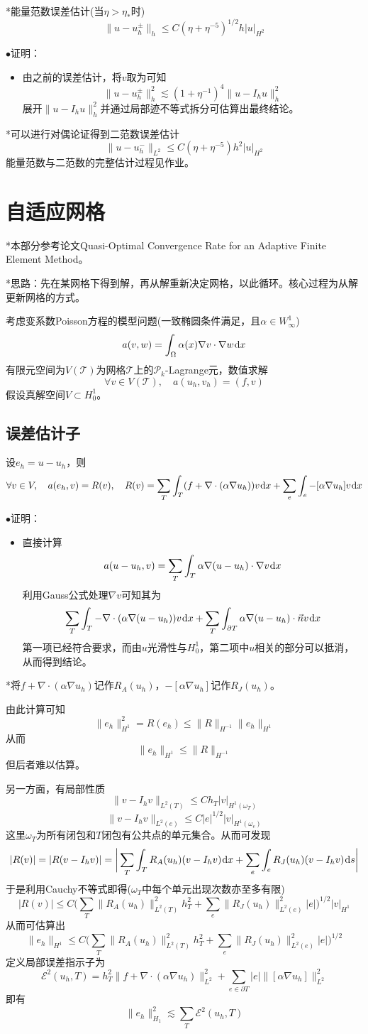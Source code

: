 \documentclass[a4paper,UTF8,fontset=windows]{ctexart}
\newcommand*{\dr}{\hspace{0.07em}\mathrm{d}}
\newcommand*{\ce}{\mathcal{E}}
\newcommand*{\cp}{\mathcal{P}}
\newcommand*{\ct}{\mathcal{T}}
\newcommand{\proo}[1]{{\kaishu $\bullet$证明：
\begin{itemize}
    \item[] #1
\end{itemize}
}}
\begin{document}
*能量范数误差估计(当$\eta>\eta_*$时)
$$\|u-u_h^\pm\|_h\le C(\eta+\eta^{-5})^{1/2}h|u|_{H^2}$$

\proo{
    由之前的误差估计，将$v$取为可知
    $$\|u-u_h^\pm\|_h^2\lesssim(1+\eta^{-1})^4\|u-I_hu\|_h^2$$
    展开$\|u-I_hu\|_h^2$并通过局部迹不等式拆分可估算出最终结论。
}

*可以进行对偶论证得到二范数误差估计
$$\|u-u_h^-\|_{L^2}\le C(\eta+\eta^{-5})h^2|u|_{H^2}$$
能量范数与二范数的完整估计过程见作业。

\section{自适应网格}
*本部分参考论文Quasi-Optimal Convergence Rate for an Adaptive Finite Element Method。

*思路：先在某网格下得到解，再从解重新决定网格，以此循环。核心过程为从解更新网格的方式。

考虑变系数Poisson方程的模型问题(一致椭圆条件满足，且$\alpha\in W_\infty^1$)
$$a(v,w)=\int_\Omega\alpha(x)\nabla v\cdot\nabla w\dr x$$
有限元空间为$V(\ct)$为网格$\ct$上的$\cp_k$-Lagrange元，数值求解
$$\forall v\in V(\ct),\quad a(u_h,v_h)=(f,v)$$
假设真解空间$V\subset H_0^1$。

\subsection{误差估计子}
设$e_h=u-u_h$，则
$$\forall v\in V,\quad a(e_h,v)=R(v),\quad R(v)=\sum_T\int_T(f+\nabla\cdot(\alpha\nabla u_h))v\dr x+\sum_e\int_e-[\alpha\nabla u_h]v\dr x$$

\proo{
    直接计算
    $$a(u-u_h,v)=\sum_T\int_T\alpha\nabla(u-u_h)\cdot\nabla v\dr x$$
    利用Gauss公式处理$\nabla v$可知其为
    $$\sum_T\int_T-\nabla\cdot(\alpha\nabla(u-u_h))v\dr x+\sum_T\int_{\partial T}\alpha\nabla(u-u_h)\cdot\vec{n}v\dr x$$
    第一项已经符合要求，而由$u$光滑性与$H_0^1$，第二项中$u$相关的部分可以抵消，从而得到结论。
}

*将$f+\nabla\cdot(\alpha\nabla u_h)$记作$R_A(u_h)$，$-[\alpha\nabla u_h]$记作$R_J(u_h)$。

由此计算可知
$$\|e_h\|_{H^1}^2=R(e_h)\le\|R\|_{H^{-1}}\|e_h\|_{H^1}$$
从而
$$\|e_h\|_{H^1}\le\|R\|_{H^{-1}}$$
但后者难以估算。

另一方面，有局部性质
$$\|v-I_hv\|_{L^2(T)}\le  Ch_T|v|_{H^1(\omega_T)}$$
$$\|v-I_hv\|_{L^2(e)}\le C|e|^{1/2}|v|_{H^1(\omega_e)}$$
这里$\omega_T$为所有闭包和$T$闭包有公共点的单元集合。从而可发现
$$|R(v)|=|R(v-I_hv)|=\bigg|\sum_T\int_TR_A(u_h)(v-I_hv)\dr x+\sum_e\int_eR_J(u_h)(v-I_hv)\dr s\bigg|$$
于是利用Cauchy不等式即得($\omega_T$中每个单元出现次数亦至多有限)
$$|R(v)|\le C\bigg(\sum_T\|R_A(u_h)\|_{L^2(T)}^2h_T^2+\sum_e\|R_J(u_h)\|_{L^2(e)}^2|e|\bigg)^{1/2}|v|_{H^1}$$
从而可估算出
$$\|e_h\|_{H^1}\le C\bigg(\sum_T\|R_A(u_h)\|_{L^2(T)}^2h_T^2+\sum_e\|R_J(u_h)\|_{L^2(e)}^2|e|\bigg)^{1/2}$$
定义局部误差指示子为
$$\ce^2(u_h,T)=h_T^2\|f+\nabla\cdot(\alpha\nabla u_h)\|_{L^2}^2+\sum_{e\in\partial T}|e|\|[\alpha\nabla u_h]\|_{L^2}^2$$
即有
$$\|e_h\|_{H_1}^2\lesssim\sum_T\ce^2(u_h,T)$$
\end{document}

